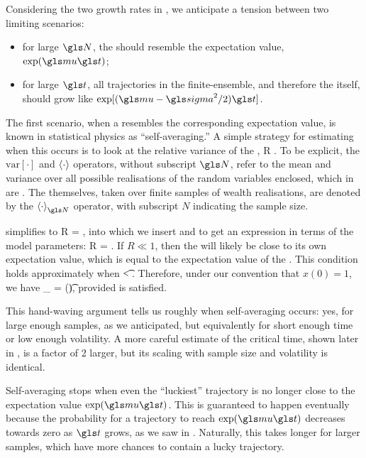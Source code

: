 Considering the two growth rates in , we anticipate a tension between two limiting scenarios:
\begin{itemize}
\item for large $\N$, the \FEA should resemble the expectation value, $\exp(\gmu \t)$;
\item for large $\t$, all trajectories in the finite-ensemble, and therefore the \FEA itself, should grow like $\exp[(\gmu-\gsigma^2/2)\t]$.
\end{itemize}
The first scenario, when a \FEA resembles the corresponding expectation value, is known in statistical physics as ``self-averaging.'' A simple strategy for estimating when this occurs is to look at the relative variance of the \FEA,
\be
R \equiv {}.
\ee
To be explicit, the $\text{var}[\cdot]$ and $\left\langle\cdot\right\rangle$ operators, without subscript $\N$, refer to the mean and variance over all possible realisations of the random variables enclosed, which in  are \FEAs. The \FEAs themselves, taken over finite samples of wealth realisations, are denoted by the $\ave{\cdot}_\N$ operator, with subscript $N$ indicating the sample size.

 simplifies to
\be
R = ,
\ee
into which we insert  and  to get an expression in terms of the \GBM model parameters:
\be
R = .
\ee
If $R \ll 1$, then the \FEA will likely be close to its own expectation value, which is equal to the expectation value of the \GBM. This condition holds approximately when
\be
\t < .
\ee
Therefore, under our convention that $x(0)=1$, we have
\be
\ave{\x(\t)}_\N\approx\ave{\x(\t)} = \exp(\gmu\t),
\ee
provided  is satisfied.

This hand-waving argument tells us roughly when self-averaging occurs: yes, for large enough samples, as we anticipated, but equivalently for short enough time or low enough volatility. A more careful estimate of the critical time, shown later in , is a factor of 2 larger, but its scaling with sample size and volatility is identical.

Self-averaging stops when even the ``luckiest'' trajectory is no longer close to the expectation value $\exp(\gmu \t)$. This is guaranteed to happen eventually because the probability for a trajectory to reach $\exp(\gmu \t)$ decreases towards zero as $\t$ grows, as we saw in . Naturally, this takes longer for larger samples, which have more chances to contain a lucky trajectory.

